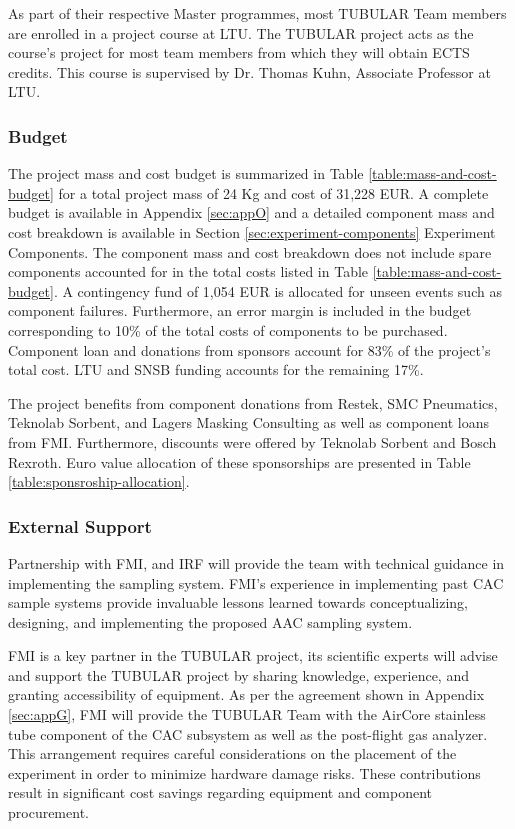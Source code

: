 As part of their respective Master programmes, most TUBULAR Team members are enrolled in a project course at LTU. The TUBULAR project acts as the course's project for most team members from which they will obtain ECTS credits. This course is supervised by Dr. Thomas Kuhn, Associate Professor at LTU.

\pagebreak
\subsubsection{Budget}
\label{sec:3.2.2}
The project mass and cost budget is summarized in Table \ref{table:mass-and-cost-budget} for a total project mass of 24 Kg and cost of 31,228 EUR. A complete budget is available in Appendix \ref{sec:appO} and a detailed component mass and cost breakdown is available in Section \ref{sec:experiment-components} Experiment Components. The component mass and cost breakdown does not include spare components accounted for in the total costs listed in Table \ref{table:mass-and-cost-budget}. A contingency fund of 1,054 EUR is allocated for unseen events such as component failures. Furthermore, an error margin is included in the budget corresponding to 10\% of the total costs of components to be purchased. Component loan and donations from sponsors account for 83\% of the project's total cost. LTU and SNSB funding accounts for the remaining 17\%. 



The project benefits from component donations from Restek, SMC Pneumatics, Teknolab Sorbent, and Lagers Masking Consulting as well as component loans from FMI. Furthermore, discounts were offered by Teknolab Sorbent and Bosch Rexroth. Euro value allocation of these sponsorships are presented in Table \ref{table:sponsroship-allocation}.




\subsubsection{External Support}

Partnership with FMI, and IRF will provide the team with technical guidance in implementing the sampling system. FMI’s experience in implementing past CAC sample systems provide invaluable lessons learned towards conceptualizing, designing, and implementing the proposed AAC sampling system.

FMI is a key partner in the TUBULAR project, its scientific experts will advise and support the TUBULAR project by sharing knowledge, experience, and granting accessibility of equipment. As per the agreement shown in Appendix \ref{sec:appG}, FMI will provide the TUBULAR Team with the AirCore stainless tube component of the CAC subsystem as well as the post-flight gas analyzer. This arrangement requires careful considerations on the placement of the experiment in order to minimize hardware damage risks. These contributions result in significant cost savings regarding equipment and component procurement.

